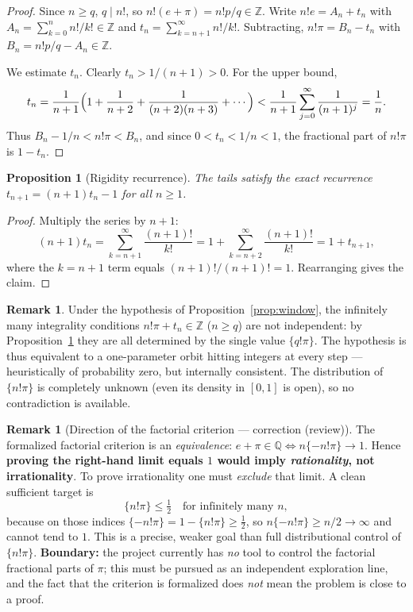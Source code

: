 \documentclass[11pt]{amsart}
\newtheorem{proposition}[theorem]{Proposition}
\theoremstyle{definition}
\newtheorem{remark}[theorem]{Remark}
\theoremstyle{remark}
\numberwithin{equation}{section}
\newcommand{\Q}{\mathbb{Q}}
\newcommand{\Z}{\mathbb{Z}}
\begin{document}
\begin{proof}
Since $n\ge q$, $q\mid n!$, so $n!(e+\pi)=n!p/q\in\Z$. Write $n!e=A_n+t_n$ with $A_n=\sum_{k=0}^n n!/k!\in\Z$ and $t_n=\sum_{k=n+1}^\infty n!/k!$. Subtracting, $n!\pi=B_n-t_n$ with $B_n=n!p/q-A_n\in\Z$.

We estimate $t_n$. Clearly $t_n>1/(n+1)>0$. For the upper bound,
\[
t_n=\frac1{n+1}\Bigl(1+\frac1{n+2}+\frac1{(n+2)(n+3)}+\cdots\Bigr)
<\frac1{n+1}\sum_{j=0}^\infty\frac1{(n+1)^j}=\frac1n.
\]
Thus $B_n-1/n<n!\pi<B_n$, and since $0<t_n<1/n<1$, the fractional part of $n!\pi$ is $1-t_n$.
\end{proof}

\begin{proposition}[Rigidity recurrence]\label{prop:recurrence}
The tails satisfy the exact recurrence $t_{n+1}=(n+1)t_n-1$ for all $n\ge1$.
\end{proposition}

\begin{proof}
Multiply the series by $n+1$:
\[
(n+1)t_n=\sum_{k=n+1}^{\infty}\frac{(n+1)!}{k!}=1+\sum_{k=n+2}^{\infty}\frac{(n+1)!}{k!}=1+t_{n+1},
\]
where the $k=n+1$ term equals $(n+1)!/(n+1)!=1$. Rearranging gives the claim.
\end{proof}

\begin{remark}
Under the hypothesis of Proposition~\ref{prop:window}, the infinitely many integrality conditions $n!\pi+t_n\in\Z$ ($n\ge q$) are not independent: by Proposition~\ref{prop:recurrence} they are all determined by the single value $\{q!\pi\}$. The hypothesis is thus equivalent to a one-parameter orbit hitting integers at every step --- heuristically of probability zero, but internally consistent. The distribution of $\{n!\pi\}$ is completely unknown (even its density in $[0,1]$ is open), so no contradiction is available.
\end{remark}

\begin{remark}[Direction of the factorial criterion --- correction (review)]\label{rem:factorial-direction}
The formalized factorial criterion is an \emph{equivalence}: $e+\pi\in\Q \iff n\{-n!\pi\}\to1$. Hence \textbf{proving the right-hand limit equals $1$ would imply \emph{rationality}, not irrationality}. To prove irrationality one must \emph{exclude} that limit. A clean sufficient target is
\[
\{n!\pi\}\le\tfrac12 \quad\text{for infinitely many }n,
\]
because on those indices $\{-n!\pi\}=1-\{n!\pi\}\ge\tfrac12$, so $n\{-n!\pi\}\ge n/2\to\infty$ and cannot tend to $1$. This is a precise, weaker goal than full distributional control of $\{n!\pi\}$. \textbf{Boundary:} the project currently has \emph{no} tool to control the factorial fractional parts of $\pi$; this must be pursued as an independent exploration line, and the fact that the criterion is formalized does \emph{not} mean the problem is close to a proof.
\end{remark}
\end{document}
